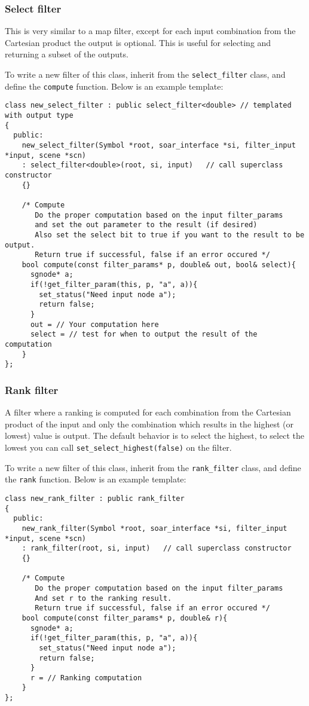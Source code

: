 \subsubsection{Select filter}
This is very similar to a map filter, except for each input combination from the 
Cartesian product the output is optional. This is useful for selecting and returning
a subset of the outputs. 

To write a new filter of this class, inherit from the \texttt{select\_filter} class, 
and define the \texttt{compute} function. Below is an example template:

{\footnotesize
\begin{verbatim}
class new_select_filter : public select_filter<double> // templated with output type
{
  public:
    new_select_filter(Symbol *root, soar_interface *si, filter_input *input, scene *scn)
    : select_filter<double>(root, si, input)   // call superclass constructor
    {}

    /* Compute
       Do the proper computation based on the input filter_params 
       and set the out parameter to the result (if desired)
       Also set the select bit to true if you want to the result to be output. 
       Return true if successful, false if an error occured */
    bool compute(const filter_params* p, double& out, bool& select){
      sgnode* a;
      if(!get_filter_param(this, p, "a", a)){
        set_status("Need input node a");
        return false;
      }
      out = // Your computation here
      select = // test for when to output the result of the computation
    }
};
\end{verbatim}
}

\subsubsection{Rank filter}
A filter where a ranking is computed for each combination from the Cartesian
product of the input and only the combination which results in the highest 
(or lowest) value is output. The default behavior is to select the highest, 
to select the lowest you can call \texttt{set\_select\_highest(false)} on the filter.

To write a new filter of this class, inherit from the \texttt{rank\_filter} class, 
and define the \texttt{rank} function. Below is an example template:

{\footnotesize
\begin{verbatim}
class new_rank_filter : public rank_filter
{
  public:
    new_rank_filter(Symbol *root, soar_interface *si, filter_input *input, scene *scn)
    : rank_filter(root, si, input)   // call superclass constructor
    {}

    /* Compute
       Do the proper computation based on the input filter_params 
       And set r to the ranking result. 
       Return true if successful, false if an error occured */
    bool compute(const filter_params* p, double& r){
      sgnode* a;
      if(!get_filter_param(this, p, "a", a)){
        set_status("Need input node a");
        return false;
      }
      r = // Ranking computation
    }
};
\end{verbatim}
}

